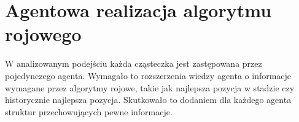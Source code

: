 \section{Agentowa realizacja algorytmu rojowego}

W analizowanym podejściu każda cząsteczka jest zastępowana przez pojedynczego agenta. Wymagało to rozszerzenia wiedzy agenta o informacje wymagane przez algorytmy rojowe, takie jak najlepsza pozycja w stadzie czy historycznie najlepsza pozycja. Skutkowało to dodaniem dla każdego agenta struktur przechowujących pewne informacje.


